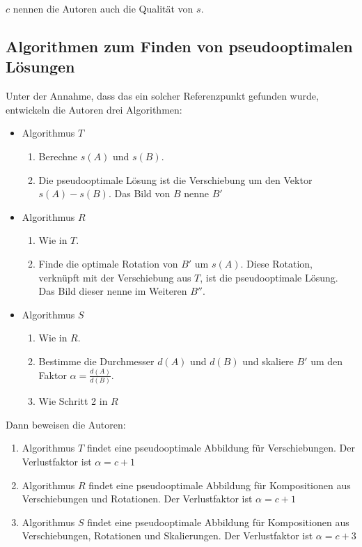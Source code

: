 $c$ nennen die Autoren auch die Qualität von $s$.

\subsection{Algorithmen zum Finden von pseudooptimalen Lösungen}

Unter der Annahme, dass das ein solcher Referenzpunkt gefunden wurde, entwickeln die Autoren drei Algorithmen:
\begin{itemize}
\item Algorithmus $T$
\begin{enumerate}
\item Berechne $s(A)$ und $s(B)$.
\item Die pseudooptimale Lösung ist die Verschiebung um den Vektor $s(A)-s(B)$. Das Bild von $B$ nenne $B'$
\end{enumerate}

\item Algorithmus $R$
\begin{enumerate}
\item Wie in $T$.
\item Finde die optimale Rotation von $B'$ um $s(A)$. Diese Rotation, verknüpft mit der Verschiebung aus $T$, ist die pseudooptimale Lösung. Das Bild dieser nenne im Weiteren $B''$.

\end{enumerate}
\item Algorithmus $S$
\begin{enumerate}
\item Wie in $R$.
\item Bestimme die Durchmesser $d(A)$ und $d(B)$ und skaliere $B'$ um den Faktor $\alpha =\frac{d(A)}{d(B)}$.
\item Wie Schritt 2 in $R$ 
\end{enumerate}
\end{itemize}

Dann beweisen die Autoren:
\begin{enumerate}
\item Algorithmus $T$ findet eine pseudooptimale Abbildung für Verschiebungen. Der Verlustfaktor ist $\alpha=c+1$
\item Algorithmus $R$ findet eine pseudooptimale Abbildung für Kompositionen aus Verschiebungen und Rotationen.  Der Verlustfaktor ist $\alpha=c+1$
\item Algorithmus $S$ findet eine pseudooptimale Abbildung für Kompositionen aus Verschiebungen, Rotationen und Skalierungen. Der Verlustfaktor ist $\alpha=c+3$
\end{enumerate}

